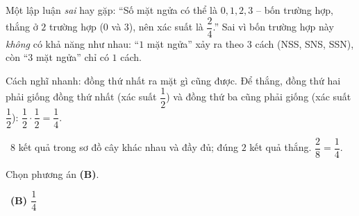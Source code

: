 \documentclass[11pt]{article}
\providecommand{\AnsWord}{Đáp số}
\newcommand{\ans}[1]{\par\smallskip{\bfseries\color{tmGreen!88!black}\AnsWord:}\ {\bfseries\color{AnsRed}#1}\par}
\newcommand{\verify}[1]{\par\smallskip\noindent{\bfseries\color{tmGreen!80!black}\faCheckCircle\ \CheckWord}\ #1\par}
\def\AnsWord{Đáp số}
\def\CheckWord{Thử lại:}
\begin{document}
{\begin{warnbox}Một lập luận \emph{sai} hay gặp: ``Số mặt ngửa có thể là $0,1,2,3$ -- bốn trường hợp, thắng ở $2$ trường hợp ($0$ và $3$), nên xác suất là $\dfrac24$.'' Sai vì bốn trường hợp này \emph{không} có khả năng như nhau: ``$1$ mặt ngửa'' xảy ra theo $3$ cách (NSS, SNS, SSN), còn ``$3$ mặt ngửa'' chỉ có $1$ cách.\end{warnbox}

\begin{tipbox}Cách nghĩ nhanh: đồng thứ nhất ra mặt gì cũng được. Để thắng, đồng thứ hai phải giống đồng thứ nhất (xác suất $\dfrac12$) và đồng thứ ba cũng phải giống (xác suất $\dfrac12$): $\dfrac12\cdot\dfrac12=\dfrac14$.\end{tipbox}

\verify{$8$ kết quả trong sơ đồ cây khác nhau và đầy đủ; đúng $2$ kết quả thắng. $\dfrac28=\dfrac14$.}
Chọn phương án \textbf{(B)}.
\ans{(B) $\dfrac14$}
}
\end{document}
